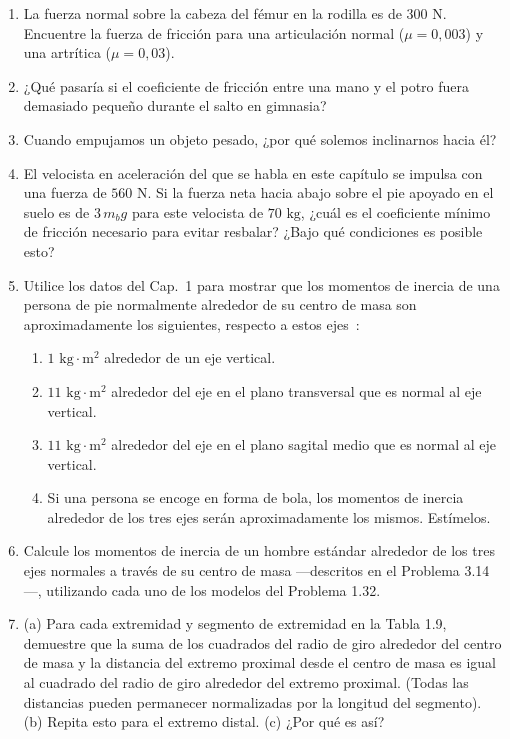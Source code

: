 \documentclass[12pt]{book}
\begin{document}
\begin{enumerate}
\item[3.10] La fuerza normal sobre la cabeza del fémur en la rodilla es de $300\text{ N}$. Encuentre la fuerza de fricción para una articulación normal ($\mu = 0{,}003$) y una artrítica ($\mu = 0{,}03$).

\item[3.11] ¿Qué pasaría si el coeficiente de fricción entre una mano y el potro fuera demasiado pequeño durante el salto en gimnasia?

\item[3.12] Cuando empujamos un objeto pesado, ¿por qué solemos inclinarnos hacia él?

\item[3.13] El velocista en aceleración del que se habla en este capítulo se impulsa con una fuerza de $560\text{ N}$. Si la fuerza neta hacia abajo sobre el pie apoyado en el suelo es de $3\,m_b g$ para este velocista de $70\text{ kg}$, ¿cuál es el coeficiente mínimo de fricción necesario para evitar resbalar? ¿Bajo qué condiciones es posible esto?

\item[3.14] Utilice los datos del Cap.~1 para mostrar que los momentos de inercia de una persona de pie normalmente alrededor de su centro de masa son aproximadamente los siguientes, respecto a estos ejes~\cite{ref66}:
\begin{enumerate}
\item[(a)] $1\text{ kg}\cdot\text{m}^2$ alrededor de un eje vertical.
\item[(b)] $11\text{ kg}\cdot\text{m}^2$ alrededor del eje en el plano transversal que es normal al eje vertical.
\item[(c)] $11\text{ kg}\cdot\text{m}^2$ alrededor del eje en el plano sagital medio que es normal al eje vertical.
\item[(d)] Si una persona se encoge en forma de bola, los momentos de inercia alrededor de los tres ejes serán aproximadamente los mismos. Estímelos.
\end{enumerate}

\item[3.15] Calcule los momentos de inercia de un hombre estándar alrededor de los tres ejes normales a través de su centro de masa ---descritos en el Problema 3.14---, utilizando cada uno de los modelos del Problema 1.32.

\item[3.16] (a) Para cada extremidad y segmento de extremidad en la Tabla 1.9, demuestre que la suma de los cuadrados del radio de giro alrededor del centro de masa y la distancia del extremo proximal desde el centro de masa es igual al cuadrado del radio de giro alrededor del extremo proximal. (Todas las distancias pueden permanecer normalizadas por la longitud del segmento).
(b) Repita esto para el extremo distal.
(c) ¿Por qué es así?


\end{enumerate}
\end{document}
